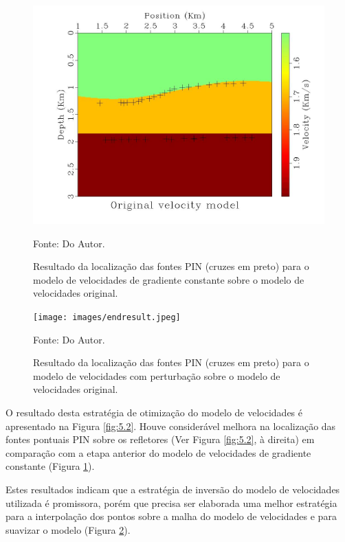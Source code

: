 \begin{figure}[H]
\caption{Resultado da localização das fontes PIN (cruzes em preto)
para o modelo de velocidades de gradiente constante sobre o modelo de velocidades original.}
\begin{center}
\includegraphics[scale=0.25]{images/gzvel.jpeg}
\vspace{-0.3cm}
\end{center}
\begin{center}
 Fonte: Do Autor.
\end{center}
\label{fig:5.3}
\end{figure}

\begin{figure}[H]
\caption{Resultado da localização das fontes PIN (cruzes em preto)
para o modelo de velocidades com perturbação sobre o modelo de velocidades original.}
\begin{center}
\texttt{[image: images/endresult.jpeg]}
\vspace{-0.3cm}
\end{center}
\begin{center}
 Fonte: Do Autor.
\end{center}
\label{fig:5.4}
\end{figure}

O resultado desta estratégia de otimização do modelo de velocidades é apresentado na Figura \ref{fig:5.2}.
Houve considerável melhora na localização das fontes pontuais PIN sobre os refletores (Ver
Figura \ref{fig:5.2}, à direita) em comparação com a etapa anterior do modelo de velocidades de
gradiente constante (Figura \ref{fig:5.3}).

Estes resultados indicam que a estratégia de inversão do modelo de velocidades utilizada é promissora, porém
que precisa ser elaborada uma melhor estratégia para a interpolação dos pontos sobre a malha do modelo de
velocidades e para suavizar o modelo (Figura \ref{fig:5.4}).
